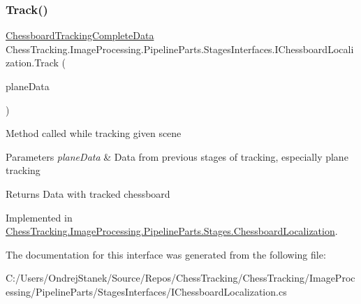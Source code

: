 \subsubsection{\texorpdfstring{Track()}{Track()}}
{\footnotesize\ttfamily \mbox{\hyperlink{class_chess_tracking_1_1_image_processing_1_1_pipeline_data_1_1_chessboard_tracking_complete_data}{Chessboard\+Tracking\+Complete\+Data}} Chess\+Tracking.\+Image\+Processing.\+Pipeline\+Parts.\+Stages\+Interfaces.\+I\+Chessboard\+Localization.\+Track (\begin{DoxyParamCaption}\item[{\mbox{\hyperlink{class_chess_tracking_1_1_image_processing_1_1_pipeline_data_1_1_plane_tracking_complete_data}{Plane\+Tracking\+Complete\+Data}}}]{plane\+Data }\end{DoxyParamCaption})}



Method called while tracking given scene 


\begin{DoxyParams}{Parameters}
{\em plane\+Data} & Data from previous stages of tracking, especially plane tracking\\
\hline
\end{DoxyParams}
\begin{DoxyReturn}{Returns}
Data with tracked chessboard
\end{DoxyReturn}


Implemented in \mbox{\hyperlink{class_chess_tracking_1_1_image_processing_1_1_pipeline_parts_1_1_stages_1_1_chessboard_localization_af037b24a2883a66cd72895a7d2db3965}{Chess\+Tracking.\+Image\+Processing.\+Pipeline\+Parts.\+Stages.\+Chessboard\+Localization}}.



The documentation for this interface was generated from the following file\+:\begin{DoxyCompactItemize}
\item 
C\+:/\+Users/\+Ondrej\+Stanek/\+Source/\+Repos/\+Chess\+Tracking/\+Chess\+Tracking/\+Image\+Processing/\+Pipeline\+Parts/\+Stages\+Interfaces/I\+Chessboard\+Localization.\+cs\end{DoxyCompactItemize}
